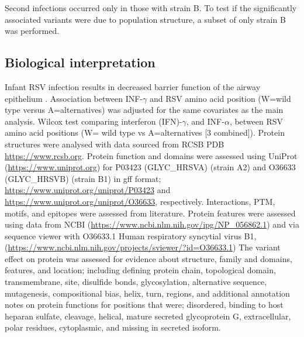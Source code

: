 \documentclass{article} %
\begin{document}
Second infections occurred only in those with strain B. 
To test if the significantly associated variants were due to population structure, 
a subset of only strain B was performed. 

\subsection{Biological interpretation}
Infant RSV infection results in decreased barrier function of the airway epithelium
\cite{connelly2021metabolic}.
Association between INF-$\gamma$ and RSV amino acid position (W=wild type versus A=alternatives) was adjusted for the same covariates as the main analysis.
Wilcox test comparing interferon (IFN)-$\gamma$, and INF-$\alpha$, between RSV amino acid positions (W= wild type vs A=alternatives [3 combined]).
Protein structures were analysed with data sourced from 
RCSB PDB \url{https://www.rcsb.org}.
Protein function and domains were assessed using 
UniProt	(\url{https://www.uniprot.org})
for P03423 (GLYC\_HRSVA) (strain A2) and O36633 (GLYC\_HRSVB) (strain B1) in gff format;
\url{https://www.uniprot.org/uniprot/P03423} and
\url{https://www.uniprot.org/uniprot/O36633}, respectively.
Interactions, PTM, motifs, and epitopes were assessed from literature. 
Protein features were assessed using data from NCBI
(\url{https://www.ncbi.nlm.nih.gov/ipg/NP_056862.1}) and
via sequence viewer with O36633.1 Human respiratory syncytial virus B1, 
(\url{https://www.ncbi.nlm.nih.gov/projects/sviewer/?id=O36633.1})
The variant effect on protein was assessed for evidence about structure, family and domains, features, and location; 
including defining protein chain, topological domain, transmembrane, site, disulfide bonds, glycosylation, alternative sequence, mutagenesis, compositional bias, helix, turn, regions, and additional annotation notes on protein functions for positions that were; disordered, binding to host heparan sulfate, cleavage, helical, mature secreted glycoprotein G, extracellular, polar residues, cytoplasmic, and missing in secreted isoform.
\end{document}
